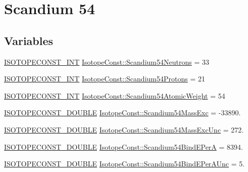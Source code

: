 \hypertarget{group___isotope_const-_scandium-_sc54}{}\section{Scandium 54}
\label{group___isotope_const-_scandium-_sc54}
\subsection*{Variables}
\begin{DoxyCompactItemize}
\item 
\mbox{\hyperlink{group___isotope_const-_macros_ga5f18360b3e99483a35c32d789e62621c}{I\+S\+O\+T\+O\+P\+E\+C\+O\+N\+S\+T\+\_\+\+I\+NT}} \mbox{\hyperlink{group___isotope_const-_scandium-_sc54_ga47bfa132772d391e1020d638838a6ff1}{Isotope\+Const\+::\+Scandium54\+Neutrons}} = 33
\item 
\mbox{\hyperlink{group___isotope_const-_macros_ga5f18360b3e99483a35c32d789e62621c}{I\+S\+O\+T\+O\+P\+E\+C\+O\+N\+S\+T\+\_\+\+I\+NT}} \mbox{\hyperlink{group___isotope_const-_scandium-_sc54_ga9ad760a2b1da010402d7cab82ac48be2}{Isotope\+Const\+::\+Scandium54\+Protons}} = 21
\item 
\mbox{\hyperlink{group___isotope_const-_macros_ga5f18360b3e99483a35c32d789e62621c}{I\+S\+O\+T\+O\+P\+E\+C\+O\+N\+S\+T\+\_\+\+I\+NT}} \mbox{\hyperlink{group___isotope_const-_scandium-_sc54_gaf5398eb4ce225112a89ce9b20d95b5d7}{Isotope\+Const\+::\+Scandium54\+Atomic\+Weight}} = 54
\item 
\mbox{\hyperlink{group___isotope_const-_macros_ga8f45a7272ce02c0b4c65c44636ed719a}{I\+S\+O\+T\+O\+P\+E\+C\+O\+N\+S\+T\+\_\+\+D\+O\+U\+B\+LE}} \mbox{\hyperlink{group___isotope_const-_scandium-_sc54_gaa2f63d2fc268ea21b32d84dbb4e9f7df}{Isotope\+Const\+::\+Scandium54\+Mass\+Exc}} = -\/33890.
\item 
\mbox{\hyperlink{group___isotope_const-_macros_ga8f45a7272ce02c0b4c65c44636ed719a}{I\+S\+O\+T\+O\+P\+E\+C\+O\+N\+S\+T\+\_\+\+D\+O\+U\+B\+LE}} \mbox{\hyperlink{group___isotope_const-_scandium-_sc54_ga55b9941df2761735b8cad9c92de3c766}{Isotope\+Const\+::\+Scandium54\+Mass\+Exc\+Unc}} = 272.
\item 
\mbox{\hyperlink{group___isotope_const-_macros_ga8f45a7272ce02c0b4c65c44636ed719a}{I\+S\+O\+T\+O\+P\+E\+C\+O\+N\+S\+T\+\_\+\+D\+O\+U\+B\+LE}} \mbox{\hyperlink{group___isotope_const-_scandium-_sc54_ga2baf5a38db2f464b1797493ad100ea07}{Isotope\+Const\+::\+Scandium54\+Bind\+E\+PerA}} = 8394.
\item 
\mbox{\hyperlink{group___isotope_const-_macros_ga8f45a7272ce02c0b4c65c44636ed719a}{I\+S\+O\+T\+O\+P\+E\+C\+O\+N\+S\+T\+\_\+\+D\+O\+U\+B\+LE}} \mbox{\hyperlink{group___isotope_const-_scandium-_sc54_ga947a58ca4e00928a23f786814c67267c}{Isotope\+Const\+::\+Scandium54\+Bind\+E\+Per\+A\+Unc}} = 5.

\end{DoxyCompactItemize}
